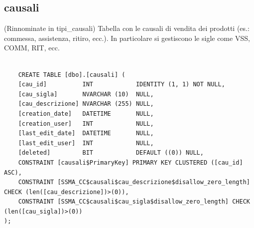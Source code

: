 \documentclass[12pt]{article}
\begin{document}
\subsection{causali}(Rinnominate in tipi\_causali)
Tabella con le causali di vendita dei prodotti (es.: commessa, assistenza, ritiro, ecc.).
In particolare si gestiscono le sigle come VSS, COMM, RIT, ecc.
\begin{lstlisting}

    CREATE TABLE [dbo].[causali] (
    [cau_id]          INT            IDENTITY (1, 1) NOT NULL,
    [cau_sigla]       NVARCHAR (10)  NULL,
    [cau_descrizione] NVARCHAR (255) NULL,
    [creation_date]   DATETIME       NULL,
    [creation_user]   INT            NULL,
    [last_edit_date]  DATETIME       NULL,
    [last_edit_user]  INT            NULL,
    [deleted]         BIT            DEFAULT ((0)) NULL,
    CONSTRAINT [causali$PrimaryKey] PRIMARY KEY CLUSTERED ([cau_id] ASC),
    CONSTRAINT [SSMA_CC$causali$cau_descrizione$disallow_zero_length] CHECK (len([cau_descrizione])>(0)),
    CONSTRAINT [SSMA_CC$causali$cau_sigla$disallow_zero_length] CHECK (len([cau_sigla])>(0))
);

\end{lstlisting}
\end{document}
